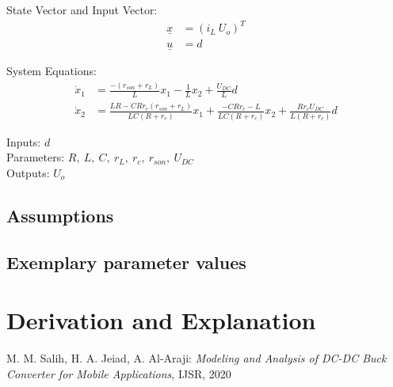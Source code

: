 \documentclass[10pt,a4paper]{article}
\begin{document}
	State Vector and Input Vector:
	\begin{align*}
		\underline{x} &= (i_L \ U_o)^T \\
		\underline{u} &= d
	\end{align*}

	\noindent System Equations:		
	\begin{subequations}
	\begin{align}
		\dot{x}_1 &= \frac{-(r_{son} + r_L)}{L} x_1 - \frac{1}{L} x_2 
					+ \frac{U_{DC}}{L} d	\\      
		\dot{x}_2 &= \frac{LR - CRr_c(r_{son} + r_L)}{LC(R + r_c)} x_1 
					+ \frac{-CRr_c - L}{LC(R + r_c)} x_2 
					+ \frac{Rr_cU_{DC}}{L(R + r_c)}	d		
	\end{align}
	\end{subequations}

	\noindent
	Inputs: $d$ 
	\\
	Parameters: $R, ~L, ~C, ~r_L, ~r_c, ~r_{son}, ~U_{DC}$ %
	\\
	Outputs: $U_o$ %
	
	
	\subsection{Assumptions} %
	
	
	\subsection{Exemplary parameter values}
	

	
	\section{Derivation and Explanation} %
	
	
	\begin{thebibliography}{10}		
		M. M. Salih, H. A. Jeiad, A. Al-Araji: 
		\textit{Modeling and Analysis of DC-DC Buck Converter for Mobile Applications}, IJSR, 2020
	\end{thebibliography}
\end{document}
